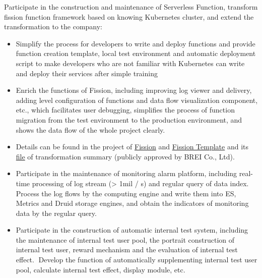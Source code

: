 \documentclass{resume}
\begin{document}
Participate in the construction and maintenance of Serverless Function, transform fission function framework based on knowing Kubernetes cluster, and extend the transformation to the company:
\begin{itemize}[topsep = 0 pt, partopsep = 0pt]
  \item Simplify the process for developers to write and deploy functions and provide function creation template, local test environment and automatic deployment script to make developers who are not familiar with Kubernetes can write and deploy their services after simple training
  \item Enrich the functions of Fission, including improving log viewer and delivery, adding level configuration of functions and data flow visualization component, etc., which facilitates user debugging, simplifies the process of function migration from the test environment to the production environment, and shows the data flow of the whole project clearly.
  \item Details can be found in the project of \href{https://github.com/jingtaozhang18/fission}{Fission} and \href{https://github.com/jingtaozhang18/fission-template}{Fission Template} and its \href{https://jingtao.fun/%E6%BA%90%E7%A0%81-Fission%E5%8A%9F%E8%83%BD%E6%8B%93%E5%B1%95/}{file} of transformation summary (publicly approved by BREI Co., Ltd).
\end{itemize}

\begin{itemize}[topsep = 0 pt, partopsep = 0pt]
  \item Participate in the maintenance of monitoring alarm platform, including real-time processing of log stream (> 1mil / s) and regular query of data index. Process the log flows by the computing engine and write them into ES, Metrics and Druid storage engines, and obtain the indicators of monitoring data by the regular query.
  \item Participate in the construction of automatic internal test system, including the maintenance of internal test user pool, the portrait construction of internal test user, reward mechanism and the evaluation of internal test effect. Develop the function of automatically supplementing internal test user pool, calculate internal test effect, display module, etc.
\end{itemize}
\end{document}
